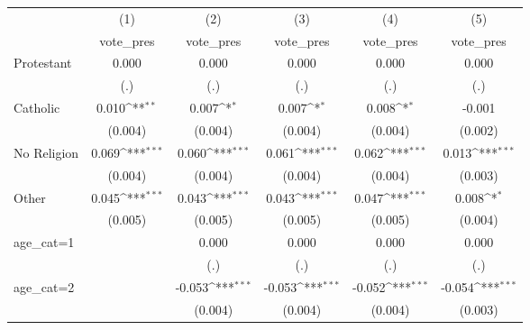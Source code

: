 {
\def\sym#1{\ifmmode^{#1}\else\(^{#1}\)\fi}
\begin{tabular}{l*{5}{c}}
\hline\hline
                    &\multicolumn{1}{c}{(1)}&\multicolumn{1}{c}{(2)}&\multicolumn{1}{c}{(3)}&\multicolumn{1}{c}{(4)}&\multicolumn{1}{c}{(5)}\\
                    &\multicolumn{1}{c}{vote\_pres}&\multicolumn{1}{c}{vote\_pres}&\multicolumn{1}{c}{vote\_pres}&\multicolumn{1}{c}{vote\_pres}&\multicolumn{1}{c}{vote\_pres}\\
\hline
Protestant          &       0.000         &       0.000         &       0.000         &       0.000         &       0.000         \\
                    &         (.)         &         (.)         &         (.)         &         (.)         &         (.)         \\
[1em]
Catholic            &       0.010\sym{**} &       0.007\sym{*}  &       0.007\sym{*}  &       0.008\sym{*}  &      -0.001         \\
                    &     (0.004)         &     (0.004)         &     (0.004)         &     (0.004)         &     (0.002)         \\
[1em]
No Religion         &       0.069\sym{***}&       0.060\sym{***}&       0.061\sym{***}&       0.062\sym{***}&       0.013\sym{***}\\
                    &     (0.004)         &     (0.004)         &     (0.004)         &     (0.004)         &     (0.003)         \\
[1em]
Other               &       0.045\sym{***}&       0.043\sym{***}&       0.043\sym{***}&       0.047\sym{***}&       0.008\sym{*}  \\
                    &     (0.005)         &     (0.005)         &     (0.005)         &     (0.005)         &     (0.004)         \\
[1em]
age\_cat=1           &                     &       0.000         &       0.000         &       0.000         &       0.000         \\
                    &                     &         (.)         &         (.)         &         (.)         &         (.)         \\
[1em]
age\_cat=2           &                     &      -0.053\sym{***}&      -0.053\sym{***}&      -0.052\sym{***}&      -0.054\sym{***}\\
                    &                     &     (0.004)         &     (0.004)         &     (0.004)         &     (0.003)         \\

\end{tabular}}
